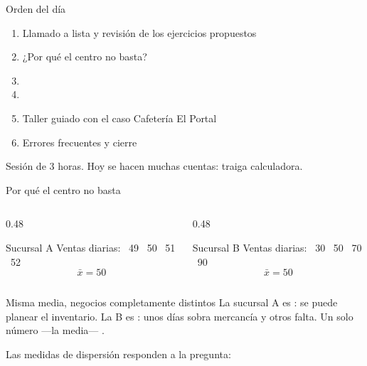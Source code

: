 \documentclass[aspectratio=169,10pt]{beamer}
\begin{document}
\portada

\begin{frame}{Orden del día}
  \begin{enumerate}
    \item Llamado a lista y revisión de los ejercicios propuestos
    \item ¿Por qué el centro no basta?
    \item {}
    \item {}
    \item Taller guiado con el caso Cafetería El Portal
    \item Errores frecuentes y cierre
  \end{enumerate}

  \vspace{0.25cm}
  {\footnotesize\color{uniGris} Sesión de 3 horas. Hoy se hacen muchas cuentas:
  traiga calculadora.}
\end{frame}

\begin{frame}{Por qué el centro no basta}
  \footnotesize
  \begin{columns}[T,onlytextwidth]
    \begin{column}{0.48\textwidth}
      \begin{block}{Sucursal A}
        \scriptsize
        Ventas diarias:  \ 49 \ 50 \ 51 \ 52 \rmfamily
        \[ \bar{x} = 50 \]
      \end{block}
    \end{column}
    \begin{column}{0.48\textwidth}
      \begin{block}{Sucursal B}
        \scriptsize
        Ventas diarias:  \ 30 \ 50 \ 70 \ 90 \rmfamily
        \[ \bar{x} = 50 \]
      \end{block}
    \end{column}
  \end{columns}

  \vspace{0.2cm}
  \begin{alertblock}{Misma media, negocios completamente distintos}
    \footnotesize
    La sucursal A es : se puede planear el inventario. La B es
    : unos días sobra mercancía y otros falta. Un solo número —la
    media— .
  \end{alertblock}

  \vspace{0.15cm}
  {\footnotesize\color{uniGris} Las medidas de dispersión responden a la
  pregunta: }
\end{frame}
\end{document}
